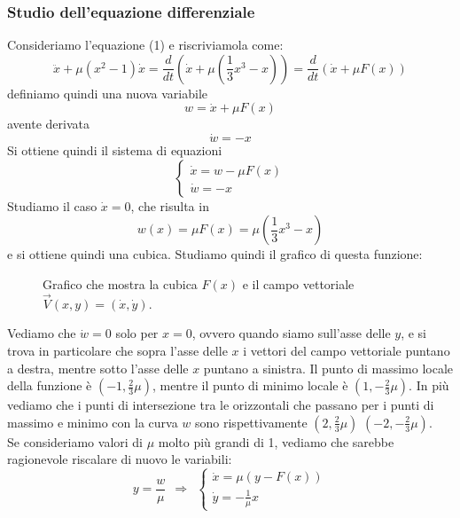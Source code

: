 \documentclass[12pt]{article}
\begin{document}
\subsubsection{Studio dell'equazione differenziale}
Consideriamo l'equazione (1) e riscriviamola come:
\begin{equation}
	\ddot{x}+\mu(x^2-1)\dot{x} = \frac{d}{dt}\left(\dot{x}+\mu\left(\frac{1}{3}x^3-x\right)\right) = \frac{d}{dt}\left(\dot{x} + \mu F(x)\right)
\end{equation}
definiamo quindi una nuova variabile
\begin{equation}
	w = \dot{x} + \mu F(x)
\end{equation}
avente derivata 
$$
	\dot{w} = -x
$$
Si ottiene quindi il sistema di equazioni
\begin{equation}
	\begin{cases}
		\dot{x} = w - \mu F(x) \\
		\dot{w} = -x
	\end{cases}
\end{equation}
Studiamo il caso $\dot{x} = 0$, che risulta in
\begin{equation}
	w(x) = \mu F(x) = \mu\left(\frac{1}{3}x^3-x\right)
\end{equation}
e si ottiene quindi una cubica. Studiamo quindi il grafico di questa funzione: 
\begin{figure}[H]
	\centering
	
	\caption{Grafico che mostra la cubica $F(x)$ e il campo vettoriale $\vec{V}(x,y) = (\dot{x},\dot{y})$.}
\end{figure}
Vediamo che $\dot{w} = 0$ solo per $x=0$, ovvero quando siamo sull'asse delle $y$, e si trova in particolare che sopra l'asse delle $x$ i vettori del campo vettoriale puntano a destra, mentre sotto l'asse delle $x$ puntano a sinistra. Il punto di massimo locale della funzione è $\left(-1,\frac{2}{3}\mu\right)$, mentre il punto di minimo locale è $\left(1,-\frac{2}{3}\mu\right)$. In più vediamo che i punti di intersezione tra le orizzontali che passano per i punti di massimo e minimo con la curva $w$ sono rispettivamente $\left(2,\frac{2}{3}\mu\right)$ $\left(-2,-\frac{2}{3}\mu\right)$. \\
Se consideriamo valori di $\mu$ molto più grandi di 1, vediamo che sarebbe ragionevole riscalare di nuovo le variabili:
\begin{equation}
	y = \frac{w}{\mu} \ \ \Longrightarrow \ \ \begin{cases}
		\dot{x} = \mu(y - F(x)) \\
		\dot{y} = -\frac{1}{\mu}x	
	\end{cases}
\end{equation}
\end{document}
